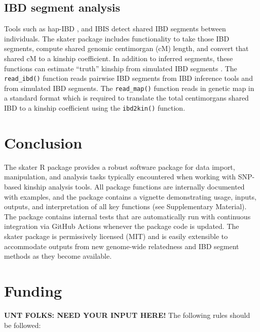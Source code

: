 \documentclass{bioinfo}
\begin{document}
\subsection{IBD segment analysis}

Tools such as hap-IBD \citep{zhou2020}, and IBIS \citep{seidman2020}
detect shared IBD segments between individuals. The skater package
includes functionality to take those IBD segments, compute shared
genomic centimorgan (cM) length, and convert that shared cM to a kinship
coefficient. In addition to inferred segments, these functions can
estimate ``truth'' kinship from simulated IBD segments
\citep{caballero2019}. The \texttt{read\_ibd()} function reads pairwise
IBD segments from IBD inference tools and from simulated IBD segments.
The \texttt{read\_map()} function reads in genetic map in a standard
format which is required to translate the total centimorgans shared IBD
to a kinship coefficient using the \texttt{ibd2kin()} function.

\section{Conclusion}

The skater R package provides a robust software package for data import,
manipulation, and analysis tasks typically encountered when working with
SNP-based kinship analysis tools. All package functions are internally
documented with examples, and the package contains a vignette
demonstrating usage, inputs, outputs, and interpretation of all key
functions (see Supplementary Material). The package contains internal
tests that are automatically run with continuous integration via GitHub
Actions whenever the package code is updated. The skater package is
permissively licensed (MIT) and is easily extensible to accommodate
outputs from new genome-wide relatedness and IBD segment methods as they
become available.

\section*{Funding}

\textbf{UNT FOLKS: NEED YOUR INPUT HERE!} The following rules should be
followed:
\end{document}
